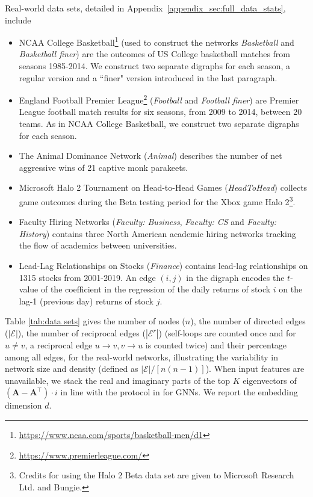 \documentclass[nohyperref]{article}
\theoremstyle{plain}
\theoremstyle{definition}
\theoremstyle{remark}
\begin{document}
Real-world data sets, detailed in Appendix~\ref{appendix_sec:full_data_stats}, include 
\begin{itemize}
    \item NCAA College Basketball\footnote{\scriptsize{\url{https://www.ncaa.com/sports/basketball-men/d1}}} (used to construct the networks \textit{Basketball} and \textit{Basketball finer}) are the
outcomes of US College basketball
matches from seasons 1985-2014. 
We construct two separate digraphs for each season, 
a regular version and a ``finer" version introduced in the last paragraph. 
\item England Football Premier League\footnote{\scriptsize{\url{https://www.premierleague.com/}}} (\textit{Football} and \textit{Football finer}) are  Premier League football
match results for six seasons, from 2009 to 2014, between 20 teams. As in NCAA College Basketball, we construct two separate digraphs for each season. 

\item The 
Animal Dominance Network (\textit{Animal}) \cite{hobson2015social} describes the number of net aggressive wins of 21 captive monk parakeets. 

\item
Microsoft Halo 2 Tournament on Head-to-Head Games (\textit{HeadToHead}) collects game outcomes during the Beta testing period for the Xbox game Halo 2\footnote{Credits for using the Halo 2 Beta data set are given to Microsoft Research Ltd. and Bungie.}. 
\item
Faculty Hiring Networks (\textit{Faculty: Business}, \textit{Faculty: CS} and \textit{Faculty: History}) \cite{clauset2015systematic} contains three North American academic hiring networks tracking the flow of academics between universities.  

\item
Lead-Lag Relationships on Stocks (\textit{Finance}) \cite{bennett2021detection} contains lead-lag relationships on 1315 stocks from 2001-2019. An edge $(i,j)$ in the digraph encodes the $t$-value of the coefficient in the regression of the daily returns of stock $i$ on the  lag-1 (previous day) returns of stock $j$.
\end{itemize}


Table \ref{tab:data sets} gives the number of nodes ($n$), the number of directed edges ($|\mathcal{E}|$), the number of reciprocal edges ($|\mathcal{E}^r|$) (self-loops are counted once and for $ u \ne v$, a reciprocal edge $u\rightarrow v, v\rightarrow u$ is counted twice) and their percentage among all edges, for the real-world networks, illustrating the variability in network size and density (defined as ${|\mathcal{E}|}/[{n(n-1)}]$). 
When input features are unavailable, we stack the real and imaginary parts of the top $K$ eigenvectors of $(\mathbf{A}-\mathbf{A}^\top)\cdot i$ in line with the protocol in \cite{cucuringu2020hermitian} for GNNs. 
We report the embedding dimension $d$.
\end{document}
